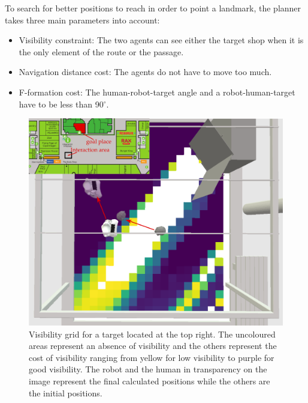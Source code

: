 To search for better positions to reach in order to point a landmark, the planner takes three main parameters into account:

\begin{itemize}
    \item Visibility constraint: The two agents can see either the target shop when it is the only element of the route or the passage.
    \item Navigation distance cost: The agents do not have to move too much.
    \item F-formation cost: The human-robot-target angle and a robot-human-target have to be less than 90${^\circ}$. 
\end{itemize}

\begin{figure}[ht!]
\centering
\includegraphics[scale=0.25]{figures/chapter8/grid_map.png}
\caption{\label{fig:chap8_svp_grid} Visibility grid for a target located at the top right. The uncoloured areas represent an absence of visibility and the others represent the cost of visibility ranging from yellow for low visibility to purple for good visibility. The robot and the human in transparency on the image represent the final calculated positions while the others are the initial positions. }
\end{figure}

